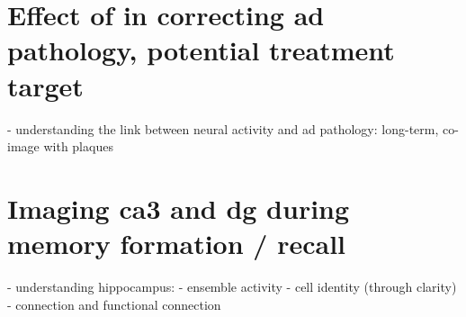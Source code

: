 \section{Effect of \tglu in correcting \gls{ad} pathology, potential treatment target}
- understanding the link between neural activity and ad pathology:
    long-term, co-image with plaques

\section{Imaging \gls{ca3} and \gls{dg} during memory formation / recall}
- understanding hippocampus:
    - ensemble activity
    - cell identity (through clarity)
    - connection and functional connection







